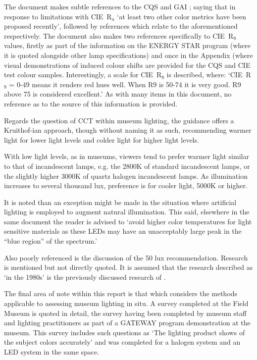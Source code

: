The document makes subtle references to the \gls{CQS} \citep{ohno_rationale_2010,baier_is_2012,davis_toward_2005,davis_color_2010} and \gls{GAI} \citep{rea_color_2008}; saying that in response to limitations with \gls{CIE}~R$_a$ `at least two other color metrics have been proposed recently', followed by references which relate to the aforementioned respectively. The document also makes two references specifically to \gls{CIE}~R$_9$ values, firstly as part of the information on the ENERGY STAR program (where it is quoted alongside other lamp specifications) and once in the Appendix (where visual demonstrations of induced colour shifts are provided for the \gls{CQS} and \gls{CIE} test colour samples. Interestingly, a scale for \gls{CIE}~R$_9$ is described, where: `\gls{CIE}~R$_9$ = 0-49 means it renders red hues well. When R9 is 50-74 it is very good. R9 above 75 is considered excellent.' As with many items in this document, no reference as to the source of this information is provided. 

Regards the question of CCT within museum lighting, the guidance offers a Kruithof-ian approach, though without naming it as such, recommending warmer light for lower light levels and colder light for higher light levels. 

\begin{itquote}{}
With low light levels, as in museums, viewers tend to prefer warmer light similar to that of incandescent lamps, e.g. the 2800K of standard incandescent lamps, or the slightly higher 3000K of quartz halogen incandescent lamps. As illumination increases to several thousand lux, preference is for cooler light, 5000K or higher.
\end{itquote}

It is noted than an exception might be made in the situation where artificial lighting is employed to augment natural illumination. This said, elsewhere in the same document the reader is advised to `avoid higher color temperatures for light sensitive materials as these LEDs may have an unacceptably large peak in the ``blue region'' of the spectrum.'

Also poorly referenced is the discussion of the 50 lux recommendation. Research is mentioned but not directly quoted. It is assumed that the research described as `in the 1980s' is the previously discussed research of \citep{loe_preferred_1982}.

The final area of note within this report is that which considers the methods applicable to assessing museum lighting in situ. A survey completed at the Field Museum \citep{myer_demonstration_2010} is quoted in detail, the survey having been completed by museum staff and lighting practitioners as part of a GATEWAY program demonstration at the museum. This survey includes such questions as `The lighting product shows \underline{\hspace{2cm}} of the subject colors accurately' and was completed for a halogen system and an LED system in the same space.

